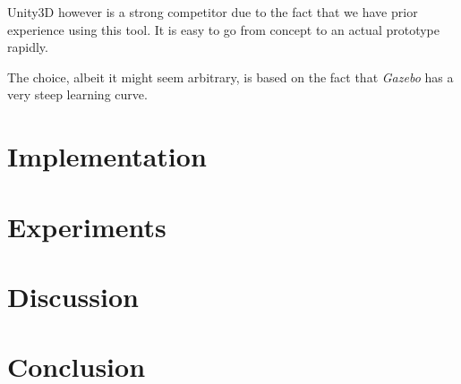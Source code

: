 \documentclass[titlepage]{article}
\begin{document}
Unity3D however is a strong competitor due to the fact that we have prior experience using this tool. It is easy to go from concept to an actual prototype rapidly.

The choice, albeit it might seem arbitrary, is based on the fact that \textit{Gazebo} has a very steep learning curve.


\section{Implementation}


\section{Experiments}


\section{Discussion}


\section{Conclusion}




\end{document}
